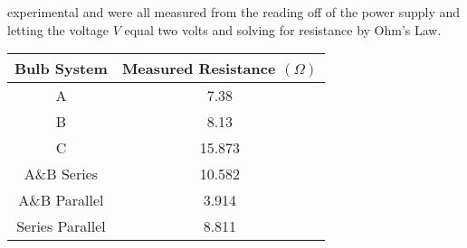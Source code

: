 \documentclass{article}
\theoremstyle{definition}
\begin{document}
experimental and were all measured from the reading off of the power supply and letting the voltage $V$ equal two volts and solving
for resistance by Ohm's Law. 
\begin{center}
    \begin{tabular}{|c|c|}
    \hline
    Bulb System & Measured Resistance $(\Omega)$ \\
    \hline
    A & 7.38 \\
    \hline
    B & 8.13 \\
    \hline
    C & 15.873 \\
    \hline
    A\&B Series & 10.582 \\
    \hline
    A\&B Parallel & 3.914 \\
    \hline
    Series Parallel & 8.811 \\
    \hline
    \end{tabular}
\end{center}
\end{document}

